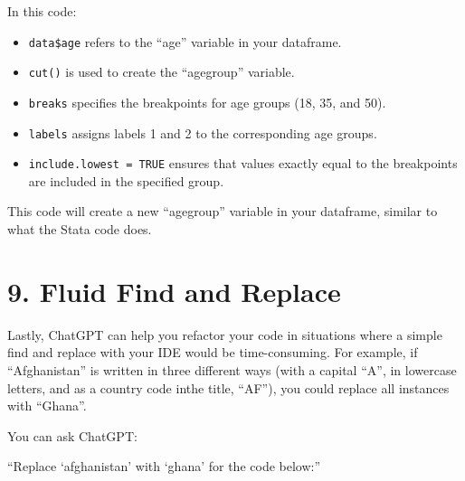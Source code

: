 \documentclass[
  letterpaper,
  DIV=11,
  numbers=noendperiod]{scrreprt}
\providecommand{\tightlist}{%
  \setlength{\itemsep}{0pt}\setlength{\parskip}{0pt}}\usepackage{longtable,booktabs,array}
\begin{document}
In this code:

\begin{itemize}
\tightlist
\item
  \texttt{data\$age} refers to the ``age'' variable in your dataframe.
\item
  \texttt{cut()} is used to create the ``agegroup'' variable.
\item
  \texttt{breaks} specifies the breakpoints for age groups (18, 35, and
  50).
\item
  \texttt{labels} assigns labels 1 and 2 to the corresponding age
  groups.
\item
  \texttt{include.lowest\ =\ TRUE} ensures that values exactly equal to
  the breakpoints are included in the specified group.
\end{itemize}

This code will create a new ``agegroup'' variable in your dataframe,
similar to what the Stata code does.

\hypertarget{fluid-find-and-replace}{%
\section{9. Fluid Find and Replace}\label{fluid-find-and-replace}}

Lastly, ChatGPT can help you refactor your code in situations where a
simple find and replace with your IDE would be time-consuming. For
example, if ``Afghanistan'' is written in three different ways (with a
capital ``A'', in lowercase letters, and as a country code inthe title,
``AF''), you could replace all instances with ``Ghana''.

You can ask ChatGPT:

``Replace `afghanistan' with `ghana' for the code below:''
\end{document}
